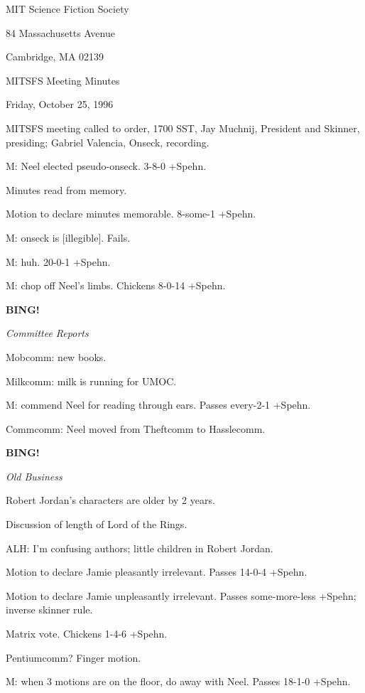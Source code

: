 \documentclass[12pt]{article}
\newcommand{\bing}{{\bf BING!} }
\newcommand{\goto}[1]{\bing \vskip 12pt \centerline{{\em{#1}}}}
\begin{document}
\begin{center}

MIT Science Fiction Society 

84 Massachusetts Avenue

Cambridge, MA 02139

\vspace{12pt}

MITSFS Meeting Minutes 

Friday, October 25, 1996

\end{center}
 
\vspace{18pt}

\setlength{\parskip}{6pt}

\noindent
MITSFS meeting called to order, 1700 SST,
Jay Muchnij, President and Skinner, presiding; Gabriel Valencia, Onseck, recording.

M: Neel elected pseudo-onseck. 3-8-0 +Spehn.

Minutes read from memory.

Motion to declare minutes memorable. 8-some-1 +Spehn.

M: onseck is [illegible]. Fails.

M: huh. 20-0-1 +Spehn.

M: chop off Neel's limbs. Chickens 8-0-14 +Spehn.

\goto{Committee Reports}

Mobcomm: new books.

Milkcomm: milk is running for UMOC.

M: commend Neel for reading through ears. Passes every-2-1 +Spehn.

Commcomm: Neel moved from Theftcomm to Hasslecomm.

\goto{Old Business}

Robert Jordan's characters are older by 2 years.

Discussion of length of Lord of the Rings.

ALH: I'm confusing authors; little children in Robert Jordan.

Motion to declare Jamie pleasantly irrelevant. Passes 14-0-4 +Spehn.

Motion to declare Jamie unpleasantly irrelevant. Passes some-more-less +Spehn; inverse skinner rule.

Matrix vote. Chickens 1-4-6 +Spehn.

Pentiumcomm? Finger motion.

M: when 3 motions are on the floor, do away with Neel. Passes 18-1-0 +Spehn.
\end{document}
